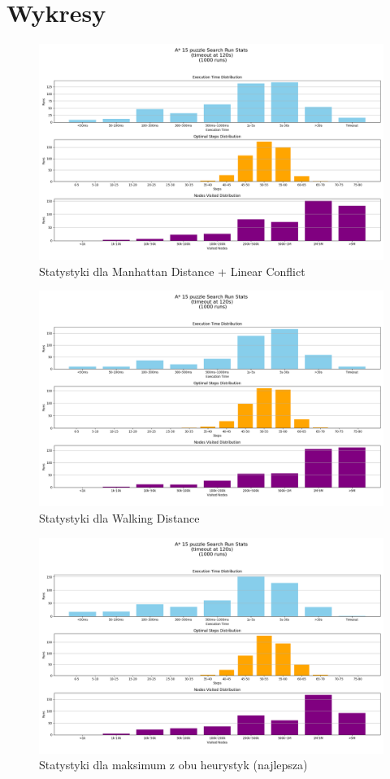 \documentclass[12pt]{article}
\begin{document}
\section{Wykresy}

\begin{figure}[h]
    \centering
    \includegraphics[width=\textwidth]{plots/(MDLC)aStar_run_stats_1000_runs.png}
    \caption{Statystyki dla Manhattan Distance + Linear Conflict}
    \label{fig:sample}
\end{figure}

\begin{figure}[h]
    \centering
    \includegraphics[width=\textwidth]{plots/(WD)aStar_run_stats_1000_runs.png}
    \caption{Statystyki dla Walking Distance}
    \label{fig:sample}
\end{figure}

\begin{figure}[h]
    \centering
    \includegraphics[width=\textwidth]{plots/(MAX)aStar_run_stats_1000_runs.png}
    \caption{Statystyki dla maksimum z obu heurystyk (najlepsza)}
    \label{fig:sample}
\end{figure}
\end{document}
